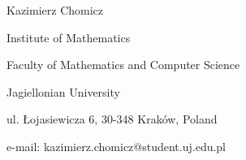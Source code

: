 \documentclass[12pt]{article}
\theoremstyle{remark}
\begin{document}



\vspace{5pt}




\begin{small}





\noindent
Kazimierz Chomicz

\noindent
Institute of Mathematics

\noindent
Faculty of Mathematics and Computer Science

\noindent
Jagiellonian University

\noindent
ul. Łojasiewicza 6, 30-348 Kraków, Poland

\noindent
e-mail: kazimierz.chomicz@student.uj.edu.pl



\end{small}	










  
\end{document}
